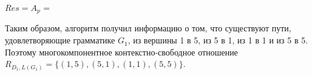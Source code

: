 \begin{center}
	$Res = A_p$ = 
\end{center}

Таким образом, алгоритм получил информацию о том, что существуют пути, удовлетворяющие грамматике $G_1$, из вершины 1 в 5, из 5 в 1, из 1 в 1 и из 5 в 5. Поэтому многокомпонентное контекстно-свободное отношение $R_{D_1, L(G_1)} = \{(1, 5), (5, 1), (1, 1), (5, 5)\}$.








